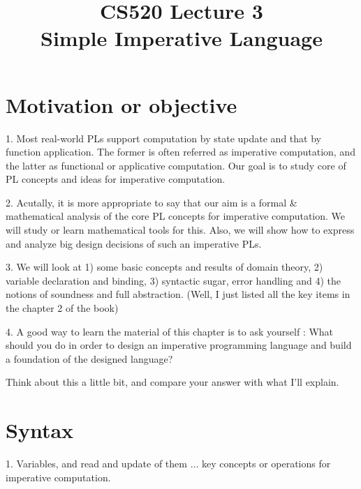 \documentclass{report}[12pt]
\begin{document}
\setlength\parindent{0pt}

  {\topsep}{\topsep}%
  {\itshape}{}%
  {\bfseries}{}%
  {\newline}{}%

\theoremstyle{break}

\newtheorem{theorem}{Theorem}[section]
\newtheorem{definition}{Definition}
\newtheorem{proposition}{Proposition}
\newtheorem{corollary}{Corollary}
\newtheorem{lemma}{Lemma}
\newtheorem{example}{Example}
\newcommand{\nonterminal}[1]{\langle \text{#1}\rangle}
\newcommand{\rem}[0]{\text{ rem }}
\newcommand{\interp}[1]{\llbracket #1 \rrbracket}
\newcommand{\bbot}[0]{\Perp}
\newcommand{\TODO}[1]{TODO : #1}

\setcounter{chapter}{3}

\title{CS520 Lecture 3\\Simple Imperative Language}
\maketitle

\section{Motivation or objective}
1. Most real-world PLs support computation by state update and that by function application. The former is often referred as imperative computation, and the latter as functional or applicative computation. Our goal is to study core of PL concepts and ideas for imperative computation.

2. Acutally, it is more appropriate to say that our aim is a formal \& mathematical analysis of the core PL concepts for imperative computation. We will study or learn mathematical tools for this. Also, we will show how to express and analyze big design decisions of such an imperative PLs.

3. We will look at 1) some basic concepts and results of domain theory, 2) variable declaration and binding, 3) syntactic sugar, error handling and 4) the notions of soundness and full abstraction. (Well, I just listed all the key items in the chapter 2 of the book)

4. A good way to learn the material of this chapter is to ask yourself : What should you do in order to design an imperative programming language and build a foundation of the designed language?

Think about this a little bit, and compare your answer with what I'll explain.
\section{Syntax}
1. Variables, and read and update of them $\ldots$ key concepts or operations for imperative computation.
\end{document}
